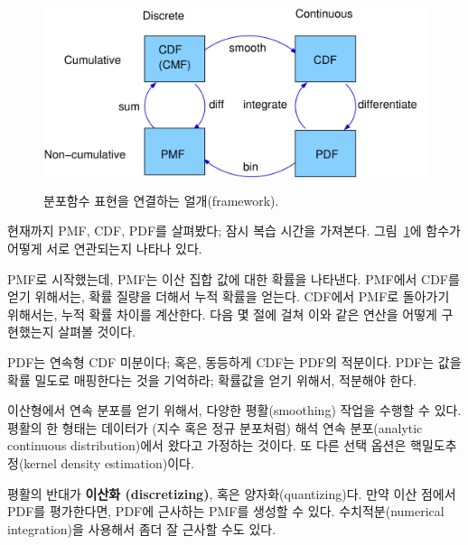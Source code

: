 \begin{figure}
\centerline{\includegraphics[height=2.2in]{figs/distribution_functions.pdf}}
\caption{분포함수 표현을 연결하는 얼개(framework).}
\label{dist_framework}
\end{figure}

현재까지 PMF, CDF, PDF를 살펴봤다; 잠시 복습 시간을 가져본다.
그림~\ref{dist_framework}에 함수가 어떻게 서로 연관되는지 나타나 있다.

PMF로 시작했는데, PMF는 이산 집합 값에 대한 확률을 나타낸다.
PMF에서 CDF를 얻기 위해서는, 확률 질량을 더해서 누적 확률을 얻는다.
CDF에서 PMF로 돌아가기 위해서는, 누적 확률 차이를 계산한다.
다음 몇 절에 걸쳐 이와 같은 연산을 어떻게 구현했는지 살펴볼 것이다.

PDF는 연속형 CDF 미분이다; 혹은, 동등하게 CDF는 PDF의 적분이다.
PDF는 값을 확률 밀도로 매핑한다는 것을 기억하라; 확률값을 얻기 위해서,
적분해야 한다.


이산형에서 연속 분포를 얻기 위해서, 다양한 평활(smoothing) 작업을 수행할 수 있다.
평활의 한 형태는 데이터가 (지수 혹은 정규 분포처럼) 
해석 연속 분포(analytic continuous distribution)에서 왔다고 가정하는 것이다.
또 다른 선택 옵션은 핵밀도추정(kernel density estimation)이다.


평활의 반대가 {\bf 이산화 (discretizing)}, 혹은 양자화(quantizing)다.
만약 이산 점에서 PDF를 평가한다면, PDF에 근사하는 PMF를 생성할 수 있다.
수치적분(numerical integration)을 사용해서 좀더 잘 근사할 수도 있다.


